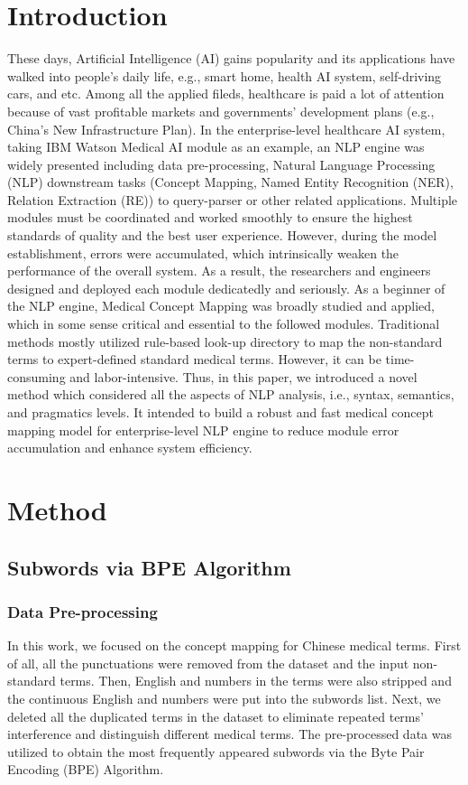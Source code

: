 \documentclass{article}
\begin{document}
\section{Introduction}
These days, Artificial Intelligence (AI) gains popularity and its applications have walked into people's daily life, e.g., smart home, health AI system, self-driving cars, and etc. Among all the applied fileds, healthcare is paid a lot of attention because of vast profitable markets and governments' development plans (e.g., China’s New Infrastructure Plan). In the enterprise-level healthcare AI system, taking IBM Watson Medical AI module as an example, an NLP engine was widely presented including data pre-processing, Natural Language Processing (NLP) downstream tasks (Concept Mapping, Named Entity Recognition (NER), Relation Extraction (RE)) to query-parser or other related applications. Multiple modules must be coordinated and worked smoothly to ensure the highest standards of quality and the best user experience. However, during the model establishment, errors were accumulated, which intrinsically weaken the performance of the overall system. As a result, the researchers and engineers designed and deployed each module dedicatedly and seriously. As a beginner of the NLP engine, Medical Concept Mapping was broadly studied and applied, which in some sense critical and essential to the followed modules. Traditional methods mostly utilized rule-based look-up directory to map the non-standard terms to expert-defined standard medical terms. However, it can be time-consuming and labor-intensive. Thus, in this paper, we introduced a novel method which considered all the aspects of NLP analysis, i.e., syntax, semantics, and pragmatics levels. It intended to build a robust and fast medical concept mapping model for enterprise-level NLP engine to reduce module error accumulation and enhance system efficiency.

\section{Method}
\subsection{Subwords via BPE Algorithm}
\subsubsection{Data Pre-processing}\label{Pre-processing}
In this work, we focused on the concept mapping for Chinese medical terms. First of all, all the punctuations were removed from the dataset and the input non-standard terms. Then, English and numbers in the terms were also stripped and the continuous English and numbers were put into the subwords list. Next, we deleted all the duplicated terms in the dataset to eliminate repeated terms' interference and distinguish different medical terms. The pre-processed data was utilized to obtain the most frequently appeared subwords via the Byte Pair Encoding (BPE) Algorithm\cite{gage1994new}.
\end{document}
